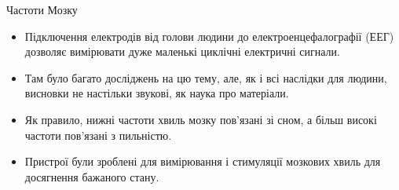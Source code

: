 {\Large Частоти Мозку}
\begin{itemize}
\item Підключення електродів від голови людини до електроенцефалографії (ЕЕГ) дозволяє вимірювати дуже маленькі циклічні електричні сигнали.
\item Там було багато досліджень на цю тему, але, як і всі наслідки для людини, висновки не настільки звукові, як наука про матеріали.
\item Як правило, нижні частоти хвиль мозку пов'язані зі сном, а більш високі частоти пов'язані з пильністю.
\item Пристрої були зроблені для вимірювання і стимуляції мозкових хвиль для досягнення бажаного стану.
\end{itemize}
